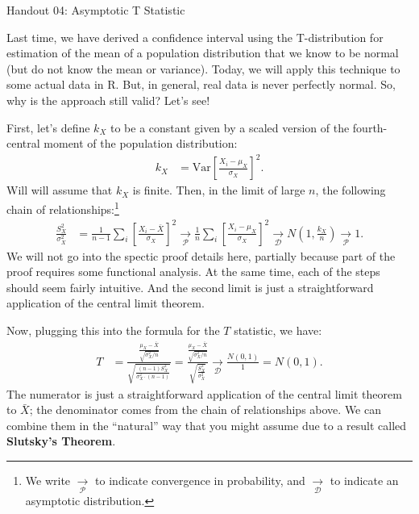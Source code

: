 \documentclass{tufte-handout}
\newcommand{\V}{\text{Var}}
\begin{document}
\justify

{\LARGE Handout 04: Asymptotic T Statistic}

\vspace*{18pt}

\noindent
Last time, we have derived a confidence interval using the
T-distribution for estimation of the mean of a population
distribution that we know to be normal (but do not know the
mean or variance). Today, we will apply this technique to
some actual data in R. But, in general, real data is never
perfectly normal. So, why is the approach still valid? Let's
see!

\vspace*{24pt}

\noindent
First, let's define $k_X$ to be a constant given by a scaled
version of the fourth-central moment of the population distribution:
\begin{align*}
k_X &= \V \left[ \frac{X_i - \mu_X}{\sigma_X} \right]^2.
\end{align*}
Will will assume that $k_X$ is finite. Then, in the limit of large
$n$, the following chain of relationships:\footnote{
  We write $\xrightarrow[\mathcal{P}]{}$ to indicate convergence
  in probability, and $\xrightarrow[\mathcal{D}]{}$ to indicate
  an asymptotic distribution.
}
\begin{align*}
\frac{S_X^2}{\sigma_X^2} &= \frac{1}{n-1} \sum_i \left[ \frac{X_i - \bar{X}}{\sigma_X} \right]^2
\xrightarrow[\mathcal{P}]{}  \frac{1}{n} \sum_i \left[ \frac{X_i - \mu_X}{\sigma_X} \right]^2
\xrightarrow[\mathcal{D}]{} N(1, \frac{k_X}{n}) \xrightarrow[\mathcal{P}]{} 1.
\end{align*}
We will not go into the spectic proof details here, partially
because part of the proof requires some functional analysis. At
the same time, each of the steps should seem fairly intuitive.
And the second limit is just a straightforward application of
the central limit theorem.

Now, plugging this into the formula for the $T$ statistic, we have:
\begin{align*}
T &= \frac{\frac{\mu_X - \bar{X}}{\sqrt{\sigma_X^2 / n}}}{\sqrt{\frac{(n-1)S^2_X}{\sigma_X^2 \cdot (n-1)}}}
= \frac{\frac{\mu_X - \bar{X}}{\sqrt{\sigma_X^2 / n}}}{\sqrt{\frac{S^2_X}{\sigma_X^2}}}
\xrightarrow[\mathcal{D}]{} \frac{N(0, 1)}{1} = N(0, 1).
\end{align*}
The numerator is just a straightforward application of the central
limit theorem to $\bar{X}$; the denominator comes from the chain of
relationships above. We can combine them in the ``natural'' way that
you might assume due to a result called \textbf{Slutsky's Theorem}. 
\end{document}
